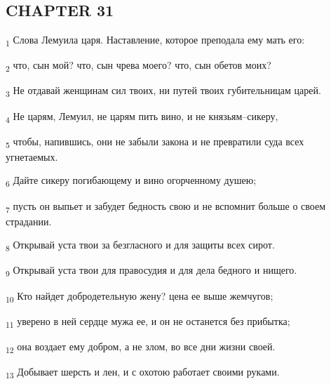 \subsection{CHAPTER 31}
\begin{tcolorbox}
\textsubscript{1} Слова Лемуила царя. Наставление, которое преподала ему мать его:
\end{tcolorbox}
\begin{tcolorbox}
\textsubscript{2} что, сын мой? что, сын чрева моего? что, сын обетов моих?
\end{tcolorbox}
\begin{tcolorbox}
\textsubscript{3} Не отдавай женщинам сил твоих, ни путей твоих губительницам царей.
\end{tcolorbox}
\begin{tcolorbox}
\textsubscript{4} Не царям, Лемуил, не царям пить вино, и не князьям--сикеру,
\end{tcolorbox}
\begin{tcolorbox}
\textsubscript{5} чтобы, напившись, они не забыли закона и не превратили суда всех угнетаемых.
\end{tcolorbox}
\begin{tcolorbox}
\textsubscript{6} Дайте сикеру погибающему и вино огорченному душею;
\end{tcolorbox}
\begin{tcolorbox}
\textsubscript{7} пусть он выпьет и забудет бедность свою и не вспомнит больше о своем страдании.
\end{tcolorbox}
\begin{tcolorbox}
\textsubscript{8} Открывай уста твои за безгласного и для защиты всех сирот.
\end{tcolorbox}
\begin{tcolorbox}
\textsubscript{9} Открывай уста твои для правосудия и для дела бедного и нищего.
\end{tcolorbox}
\begin{tcolorbox}
\textsubscript{10} Кто найдет добродетельную жену? цена ее выше жемчугов;
\end{tcolorbox}
\begin{tcolorbox}
\textsubscript{11} уверено в ней сердце мужа ее, и он не останется без прибытка;
\end{tcolorbox}
\begin{tcolorbox}
\textsubscript{12} она воздает ему добром, а не злом, во все дни жизни своей.
\end{tcolorbox}
\begin{tcolorbox}
\textsubscript{13} Добывает шерсть и лен, и с охотою работает своими руками.
\end{tcolorbox}
